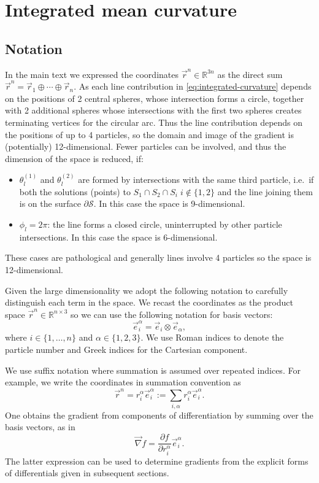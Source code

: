 \documentclass[11pt,twoside]{report}
\begin{document}
\section{Integrated mean curvature}

\subsection{Notation}

In the main text we expressed the coordinates $\vec{r}^n \in \mathbb{R}^{3n}$ as the direct sum $\vec{r}^n = \vec{r}_1 \oplus \cdots \oplus \vec{r}_n$.
As each line contribution in \eqref{eq:integrated-curvature} depends on the positions of 2 central spheres, whose intersection forms a circle, together with 2 additional spheres whose intersections with the first two spheres creates terminating vertices for the circular arc.
Thus the line contribution depends on the positions of up to 4 particles, so the domain and image of the gradient is (potentially) 12-dimensional.
Fewer particles can be involved, and thus the dimension of the space is reduced, if:
\begin{itemize}
  \item $\theta_{l}^{(1)}$ and $\theta_{l}^{(2)}$ are formed by intersections with the same third particle, i.e.\ if both the solutions (points) to $S_1 \cap S_2 \cap S_i \; i \notin \{1, 2\}$ and the line joining them is on the surface $\partial\mathcal{S}$.
  In this case the space is 9-dimensional.
  \item $\phi_l = 2\pi$: the line forms a closed circle, uninterrupted by other particle intersections.
  In this case the space is 6-dimensional.
\end{itemize}
These cases are pathological and generally lines involve 4 particles so the space is 12-dimensional.

Given the large dimensionality we adopt the following notation to carefully distinguish each term in the space.
We recast the coordinates as the product space $\vec{r}^n \in \mathbb{R}^{n \times 3}$ so we can use the following notation for basis vectors:
\begin{equation*}
  \vec{e}_i^\alpha = \vec{e}_i \otimes \vec{e}_\alpha,
\end{equation*}
where $i \in \{1,\dots,n\}$ and $\alpha \in \{1,2,3\}$.
We use Roman indices to denote the particle number and Greek indices for the Cartesian component.

We use suffix notation where summation is assumed over repeated indices.
For example, we write the coordinates in summation convention as
\begin{equation*}
  \vec{r}^n = r_i^\alpha \vec{e}_i^\alpha := \sum_{i,\alpha} r_i^\alpha \vec{e}_i^\alpha.
\end{equation*}
One obtains the gradient from components of differentiation by summing over the basis vectors, as in
\begin{equation*}
  \vec{\nabla} f =
  \frac{\partial f}{\partial r_i^\alpha} \vec{e}_i^\alpha.
\end{equation*}
The latter expression can be used to determine gradients from the explicit forms of differentials given in subsequent sections.
\end{document}
